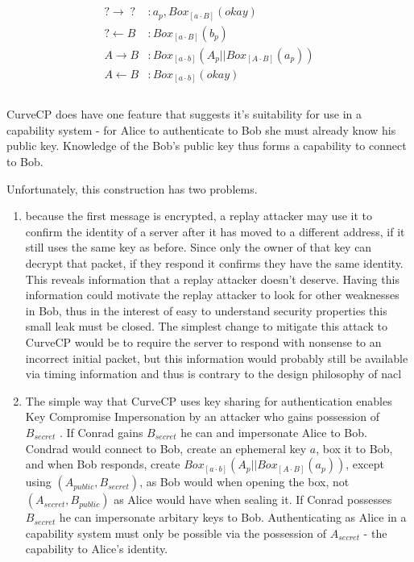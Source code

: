 \documentclass[12pt]{article}
\begin{document}
$$
\begin{align*}
\\
    ? \to \;?\;   &: a_p, Box_{[a\cdot B]}(okay) \\
    ? \gets B &: Box_{[a\cdot B]}(b_p) \\
    A \to B   &: Box_{[a\cdot b]}(A_p||Box_{[A \cdot B]}(a_p))\\
    A \gets B &: Box_{[a\cdot b]}(okay) \\
\\
\end{align*}
$$

CurveCP does have one feature that suggests it's suitability for
use in a capability system - for Alice to authenticate to Bob
she must already know his public key. Knowledge of the Bob's public
key thus forms a capability to connect to Bob.

Unfortunately, this construction has two problems.
\begin{enumerate}
\item because the first message is encrypted, a replay attacker may
  use it to confirm the identity of a server after it has moved
  to a different address, if it still uses the same key as before.
  Since only the owner of that key can decrypt that packet,
  if they respond it confirms they have the same identity.
  This reveals information that a replay attacker doesn't deserve.
  Having this information could motivate the replay attacker
  to look for other weaknesses in Bob, thus in the interest of
  easy to understand security properties this small leak must be closed.
  The simplest change to mitigate this attack to CurveCP would
  be to require the server to respond with nonsense to an incorrect
  initial packet, but this information would probably still be available
  via timing information and thus is contrary to the design philosophy
  of nacl\cite{nacl}

\item The simple way that CurveCP uses key sharing for authentication
  enables Key Compromise Impersonation by an attacker who gains possession
  of $B_{secret}$ \cite{ccp_review}. If Conrad gains
  $B_{secret}$ he can and impersonate Alice to Bob.
  Condrad would connect to Bob, create an ephemeral key $a$,
  box it to Bob, and when Bob responds, create
  $Box_{[a\cdot b]}(A_p||Box_{[A \cdot B]}(a_p))$, except using $(A_{public}, B_{secret})$,
  as Bob would when opening the box, not $(A_{secret}, B_{public})$ as Alice would
  have when sealing it. If Conrad possesses $B_{secret}$ he can impersonate arbitary
  keys to Bob. Authenticating as Alice in a capability system
  must only be possible via the possession of $A_{secret}$ - the
  capability to Alice's identity.
\end{enumerate}
\end{document}
